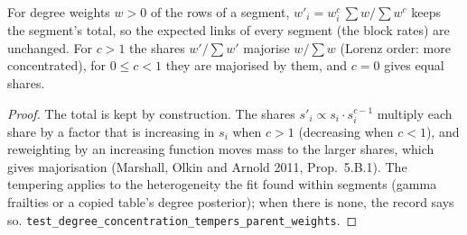 \begin{proposition}\label{prop:simdegree}
For degree weights $w>0$ of the rows of a segment, $w'_i=w_i^c\,\sum w/\sum w^c$ keeps the segment's total, so the
expected links of every segment (the block rates) are unchanged. For $c>1$ the shares $w'/\sum w'$ majorise $w/\sum w$
(Lorenz order: more concentrated), for $0\le c<1$ they are majorised by them, and $c=0$ gives equal shares.
\end{proposition}
\begin{proof}
The total is kept by construction. The shares $s'_i\propto s_i\cdot s_i^{c-1}$ multiply each share by a factor that
is increasing in $s_i$ when $c>1$ (decreasing when $c<1$), and reweighting by an increasing function moves mass to the
larger shares, which gives majorisation (Marshall, Olkin and Arnold 2011, Prop.~5.B.1). The tempering applies to the
heterogeneity the fit found within segments (gamma frailties or a copied table's degree posterior); when there is
none, the record says so. \texttt{test\_degree\_concentration\_tempers\_parent\_weights}.
\end{proof}
\setcounter{proposition}{\value{savedpropsim}}
